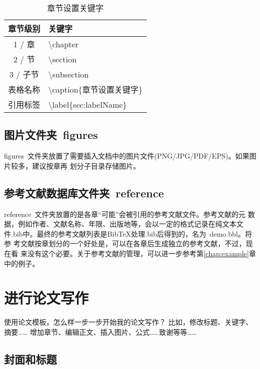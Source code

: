 \begin{table}[htb]
 \centering
  \caption{章节设置关键字}     %
  \label{tab:setSection}    %
  \begin{tabular}{cl}
    \hline
    章节级别        & 关键字     \\
    \hline
    1 / 章        & \textbackslash chapter \\
    2 / 节        & \textbackslash section \\
    3 / 子节      & \textbackslash  subsection \\
    表格名称       & \textbackslash caption\{章节设置关键字\} \\
    引用标签       & \textbackslash label\{sec:labelName\} \\
    \hline
  \end{tabular}
\end{table}

\subsection{图片文件夹~figures}
\label{sec:figuresdir}

figures~文件夹放置了需要插入文档中的图片文件(PNG/JPG/PDF/EPS)。如果图片较多，建议按章再
划分子目录存储图片。

\subsection{参考文献数据库文件夹~reference}
\label{sec:bibdir}

reference~文件夹放置的是各章``可能''会被引用的参考文献文件。参考文献的元
数据，例如作者、文献名称、年限、出版地等，会以一定的格式记录在纯文本文
件.bib中。最终的参考文献列表是BibTeX处理.bib后得到的，名为~demo.bbl。将参
考文献按章划分的一个好处是，可以在各章后生成独立的参考文献，不过，现在看
来没有这个必要。关于参考文献的管理，可以进一步参考第\ref{chap:example}章
中的例子。


\section{进行论文写作}
\label{sec:format}

使用论文模板，怎么样一步一步开始我的论文写作？
比如，修改标题、关键字、摘要…… 增加章节、编辑正文、插入图片、公式……致谢等等……
\subsection{封面和标题}



